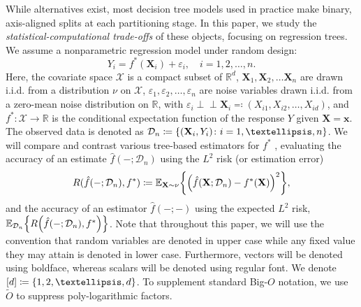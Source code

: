 \documentclass[11pt]{article}
\newcommand{\bx}{\mathbf{x}}
\newcommand{\bX}{\mathbf{X}}
\DeclarePairedDelimiter{\braces}{\lbrace}{\rbrace}
\DeclarePairedDelimiter{\paren}{(}{)}
\newcommand{\R}{\mathbb{R}}
\newcommand{\E}{\mathbb{E}}
\newcommand{\indep}{\perp\!\!\!\perp}
\renewcommand{\xspace}{\mathcal{X}}
\newcommand{\xmeasure}{\nu}
\newcommand{\nfeats}{d}
\newcommand{\nsamples}{n}
\newcommand{\coordindices}{[\nfeats]}
\newcommand{\data}[1][n]{\mathcal{D}_{#1}}
\begin{document}
While alternatives exist, most decision tree models used in practice make binary, axis-aligned splits at each partitioning stage.
In this paper, we study the \emph{statistical-computational trade-offs} of these objects, focusing on regression trees.
We assume a nonparametric regression model under random design:
\begin{equation}
    \label{eq:nonparametric_regression_model}
    Y_i = f^*(\bX_i) + \varepsilon_i, \quad i =1,2,\ldots,\nsamples.
\end{equation}
Here, the covariate space $\xspace$ is a compact subset of $\R^\nfeats$, $\bX_1,\bX_2,\ldots\bX_\nsamples$ are drawn i.i.d. from a distribution $\xmeasure$ on $\xspace$, $\varepsilon_1,\varepsilon_2,\ldots,\varepsilon_\nsamples$ are noise variables drawn i.i.d. from a zero-mean 
noise distribution on $\R$, with $\varepsilon_i \indep\bX_i \eqqcolon (X_{i1},X_{i2},\ldots,X_{i\nfeats})$, and $f^*\colon\xspace \to \R$ is the conditional expectation function of the response $Y$ given $\bX = \bx$.
The observed data is denoted as $\data \coloneqq \braces*{(\bX_i,Y_i)\colon i=1,\ldots,\nsamples}$.
We will compare and contrast various tree-based estimators for $f^*$ , evaluating the accuracy of an estimate $\hat f(-;\data)$ using the $L^2$ risk (or estimation error)
\begin{equation} \nonumber
    R(\hat f(-;\data),f^*) \coloneqq \E_{\bX\sim\xmeasure}\braces*{\paren*{\hat f(\bX;\data) - f^*(\bX)}^2},
\end{equation}
and the accuracy of an estimator $\hat f(-;-)$ using the expected $L^2$ risk, $\E_{\data}\braces*{ R\paren*{\hat f(-;\data),f^*}}$.
Note that throughout this paper, we will use the convention that random variables are denoted in upper case while any fixed value they may attain is denoted in lower case.
Furthermore, vectors will be denoted using boldface, whereas scalars will be denoted using regular font.
We denote $\coordindices \coloneqq \braces*{1,2,\ldots,\nfeats}$. 
To supplement standard Big-$O$ notation, we use $\tilde{O}$ to suppress poly-logarithmic factors. 



\end{document}
